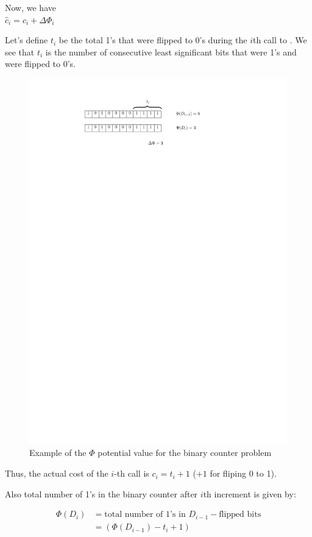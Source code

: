 \documentclass[11pt]{article}
\theoremstyle{definition}
\begin{document}
Now, we have \\
$\hat{c}_i = c_i + \Delta \Phi_i$

Let's define $t_i$ be the total 1's that were flipped to 0's during the $i$th call to .
We see that $t_i$ is the number of consecutive least significant bits that were 1's and were flipped to 0's. 
\begin{figure}[tbh]
\centering
\includegraphics[scale=1]{figures/potential.pdf}
\caption{Example of the $\Phi$ potential value for the binary counter problem}
\label{fig:potential}
\end{figure}

Thus, the actual cost of the $i$-th call is $c_i = t_i+1$ ($+1$ for fliping 0 to 1).

Also total number of 1's in the binary counter after $i$th increment is given by:

\begin{align*}
\Phi(D_i) &= \text{total number of 1's in $D_{i-1} - $flipped bits} \\
          &= (\Phi(D_{i-1}) - t_i + 1)
\end{align*}
\end{document}
